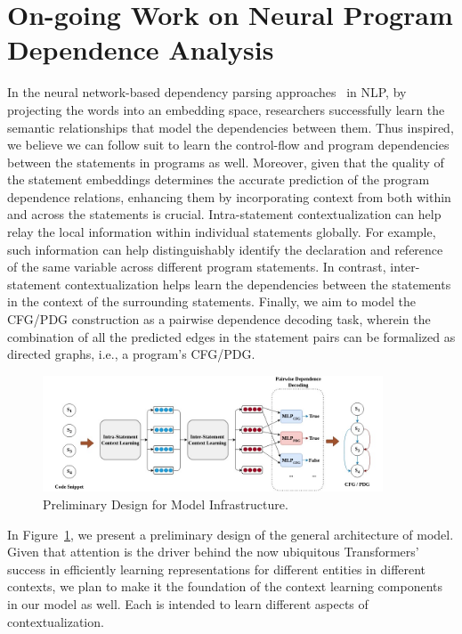 \section{On-going Work on Neural Program Dependence Analysis}
\label{sec:deeppda}

In the neural network-based dependency parsing
approaches~\cite{chen-manning-2014-fast} in NLP, by projecting the
words into an embedding space, researchers successfully learn the
semantic relationships that model the dependencies between them. Thus
inspired, we believe we can follow suit to learn the control-flow and
program dependencies between the statements in programs as
well. Moreover, given that the quality of the statement embeddings
determines the accurate prediction of the program dependence
relations, enhancing them by incorporating context from both within
and across the statements is crucial. Intra-statement
contextualization can help relay the local information within
individual statements globally. For example, such information can help
distinguishably identify the declaration and reference of the same
variable across different program statements. In contrast,
inter-statement contextualization helps learn the dependencies between
the statements in the context of the surrounding statements. Finally,
we aim to model the CFG/PDG construction as a pairwise dependence
decoding task, wherein the combination of all the predicted edges in
the statement pairs can be formalized as directed graphs, i.e., a
program's CFG/PDG.

\begin{figure}[ht]
\begin{center}
    \includegraphics[width=0.9\textwidth]{model-abstract.jpg}
    \caption{Preliminary Design for \tool Model Infrastructure.}
    \label{fig:model}
\end{center}
\end{figure}

In Figure~\ref{fig:model}, we present a preliminary design of the
general architecture of \tool model. Given that attention is the
driver behind the now ubiquitous Transformers’~\cite{Vaswani-2017}
success in efficiently learning representations for different entities
in different contexts, we plan to make it the foundation of the
context learning components in our model as well. Each is intended to
learn different aspects of contextualization.

